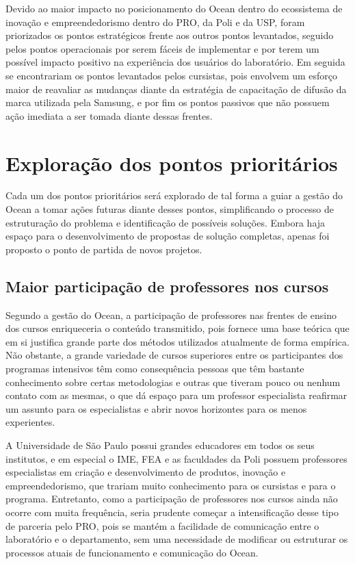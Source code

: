 Devido ao maior impacto no posicionamento do Ocean dentro do ecossistema de inovação e empreendedorismo dentro do PRO, da Poli e da USP, foram priorizados os pontos estratégicos frente aos outros pontos levantados, seguido pelos pontos operacionais por serem fáceis de implementar e por terem um possível impacto positivo na experiência dos usuários do laboratório. Em seguida se encontrariam os pontos levantados pelos cursistas, pois envolvem um esforço maior de reavaliar as mudanças diante da estratégia de capacitação de difusão da marca utilizada pela Samsung, e por fim os pontos passivos que não possuem ação imediata a ser tomada diante dessas frentes.

\section{Exploração dos pontos prioritários}

Cada um dos pontos prioritários será explorado de tal forma a guiar a gestão do Ocean a tomar ações futuras diante desses pontos, simplificando o processo de estruturação do problema e identificação de possíveis soluções. Embora haja espaço para o desenvolvimento de propostas de solução completas, apenas foi proposto o ponto de partida de novos projetos.

\subsection{Maior participação de professores nos cursos}

Segundo a gestão do Ocean, a participação de professores nas frentes de ensino dos cursos enriqueceria o conteúdo transmitido, pois fornece uma base teórica que em si justifica grande parte dos métodos utilizados atualmente de forma empírica. Não obstante, a grande variedade de cursos superiores entre os participantes dos programas intensivos têm como consequência pessoas que têm bastante conhecimento sobre certas metodologias e outras que tiveram pouco ou nenhum  contato com as mesmas, o que dá espaço para um professor especialista reafirmar um assunto para os especialistas e abrir novos horizontes para os menos experientes. 

A Universidade de São Paulo possui grandes educadores em todos os seus institutos, e em especial o IME, FEA e as faculdades da Poli possuem professores especialistas em criação e desenvolvimento de produtos, inovação e empreendedorismo, que trariam muito conhecimento para os cursistas e para o programa. Entretanto, como a participação de professores nos cursos ainda não ocorre com muita frequência, seria prudente começar a intensificação desse tipo de parceria pelo PRO, pois se mantém a facilidade de comunicação entre o laboratório e o departamento, sem uma necessidade de modificar ou estruturar os processos atuais de funcionamento e comunicação do Ocean.

